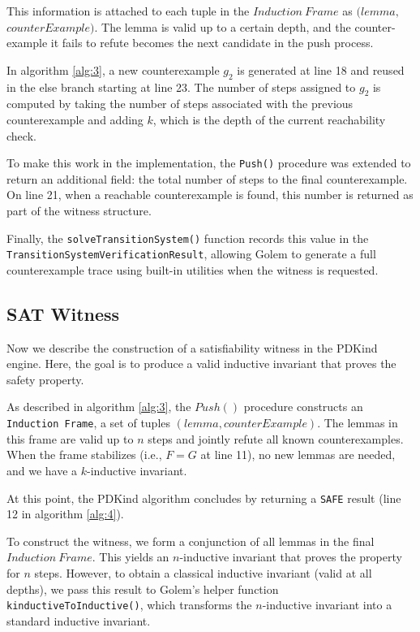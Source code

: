 This information is attached to each tuple in the \( Induction\ Frame \) as \(
(lemma, \) \\ \( counterExample) \). The lemma is valid up to a certain depth, and the
counter-\\example it fails to refute becomes the next candidate in the push
process.

In algorithm \ref{alg:3}, a new counterexample $g_2$
is generated at line 18 and reused in the else branch starting at line 23. The
number of steps assigned to $g_2$ is computed by taking the number of steps
associated with the previous counterexample and adding \( k \), which is the
depth of the current reachability check.

To make this work in the implementation, the \texttt{Push()} procedure was
extended to return an additional field: the total number of steps to the final
counterexample. On line 21, when a reachable counterexample is found, this
number is returned as part of the witness structure.

Finally, the \texttt{solveTransitionSystem()} function records this value in
the \texttt{TransitionSystemVerificationResult}, allowing Golem to generate a
full counterexample trace using built-in utilities when the witness is
requested.

\subsection*{SAT Witness}

\noindent Now we describe the construction of a satisfiability witness in the
PDKind engine. Here, the goal is to produce a valid inductive invariant that
proves the safety property.

As described in algorithm \ref{alg:3}, the \( Push()
\) procedure constructs an \texttt{Induction\ Frame}, a set of tuples \( (lemma,
counterExample) \). The lemmas in this frame are valid up to \( n \) steps and
jointly refute all known counterexamples. When the frame stabilizes (i.e., \( F
= G \) at line 11), no new lemmas are needed, and we have a \( k \)-inductive
invariant.

At this point, the PDKind algorithm concludes by returning a \texttt{SAFE}
result (line 12 in algorithm \ref{alg:4}).

To construct the witness, we form a conjunction of all lemmas in the final \(
Induction\ Frame \). This yields an \( n \)-inductive invariant that proves the
property for \( n \) steps. However, to obtain a classical inductive invariant
(valid at all depths), we pass this result to Golem's helper function
\texttt{kinductiveToInductive()}, which transforms the \( n \)-inductive
invariant into a standard inductive invariant.

